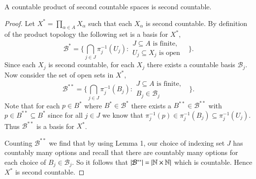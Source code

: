 \documentclass[minion]{homework651}
\begin{document}
\begin{problems}
\begin{subproblems}
\item A countable product of second countable spaces is second countable.
\begin{proof} Let $X^* = \prod_{\alpha \in A} X_\alpha$ such that each $X_\alpha$ is second countable. 
    By definition of the product topology the following set is a basis for $X^*$, 
    \begin{equation*}
        \mathcal{B}^* = \biggl\{{\bigcap_{j \in J} \pi^{-1}_j(U_j) : \begin{array}{cc}
            J\subseteq A \text{ is finite,}&\\
            U_j \subseteq X_j \text{ is open}&
          \end{array}}\biggr\}.
    \end{equation*}
    Since each $X_j$ is second countable, for each $X_j$ there exists a countable basis $\mathcal{B}_j$. 
    Now consider the set of open sets in $X^*$, 
    \begin{equation*}
        \mathcal{B}^{**} = \biggl\{{\bigcap_{j \in J} \pi^{-1}_j(B_j) : \begin{array}{cc}
            J\subseteq A \text{ is finite,}&\\
            B_j \in \mathcal{B}_j &
          \end{array}}\biggr\}.
    \end{equation*}
    Note that for each $p \in B^*$ where $B^* \in \mathcal{B}^*$ there exists a 
    $B^{**} \in \mathcal{B}^{**}$ with $p \in B^{**} \subseteq B^*$ since for all $j \in J$ we know that $\pi^{-1}_j(p) \in \pi^{-1}_j(B_j) \subseteq \pi^{-1}_j(U_j)$. 
    Thus $\mathcal{B}^{**}$ is a basis for $X^*$. 
    
    Counting $\mathcal{B}^{**}$ we find that by using Lemma 1, our choice of indexing set $J$ has countably many options and recall that there are countably many options for each 
    choice of $B_j \in \mathcal{B}_j$. So it follows that $|\mathcal{B}^{**}| = |\mathbb N \times \mathbb N|$ which is countable. Hence $X^*$ is second countable. 

    
    
\end{proof}

\end{subproblems}



\end{problems}
\end{document}
